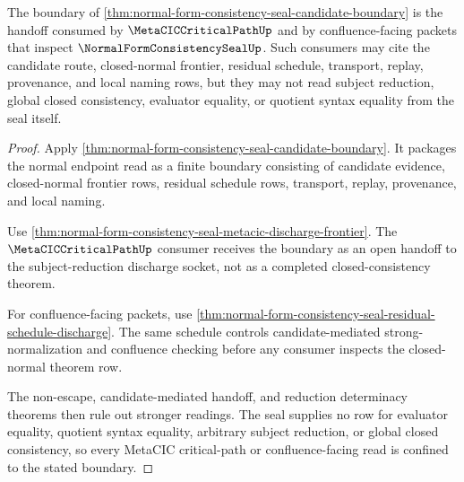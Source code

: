 \begin{theorem}
\label{thm:normal-form-consistency-seal-metacic-critical-path-handoff}
The boundary of \autoref{thm:normal-form-consistency-seal-candidate-boundary} is the handoff consumed by $\MetaCICCriticalPathUp$ and by confluence-facing packets that inspect $\NormalFormConsistencySealUp$. Such consumers may cite the candidate route, closed-normal frontier, residual schedule, transport, replay, provenance, and local naming rows, but they may not read subject reduction, global closed consistency, evaluator equality, or quotient syntax equality from the seal itself.
\end{theorem}
\begin{proof}
Apply \autoref{thm:normal-form-consistency-seal-candidate-boundary}. It packages the normal endpoint read as a finite boundary consisting of candidate evidence, closed-normal frontier rows, residual schedule rows, transport, replay, provenance, and local naming.

Use \autoref{thm:normal-form-consistency-seal-metacic-discharge-frontier}. The $\MetaCICCriticalPathUp$ consumer receives the boundary as an open handoff to the subject-reduction discharge socket, not as a completed closed-consistency theorem.

For confluence-facing packets, use \autoref{thm:normal-form-consistency-seal-residual-schedule-discharge}. The same schedule controls candidate-mediated strong-normalization and confluence checking before any consumer inspects the closed-normal theorem row.

The non-escape, candidate-mediated handoff, and reduction determinacy theorems then rule out stronger readings. The seal supplies no row for evaluator equality, quotient syntax equality, arbitrary subject reduction, or global closed consistency, so every MetaCIC critical-path or confluence-facing read is confined to the stated boundary.
\end{proof}

